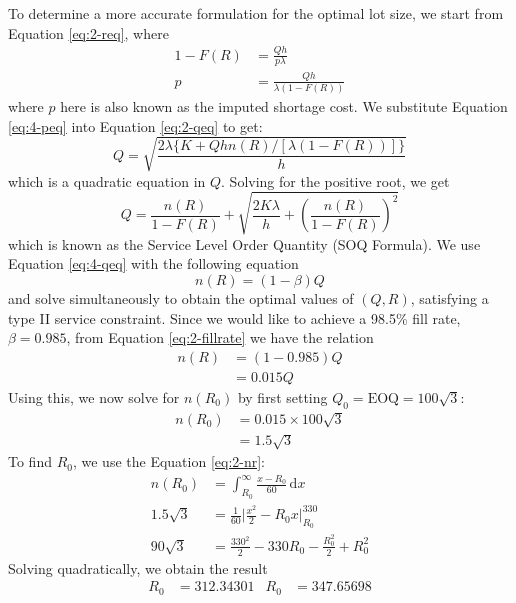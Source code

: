 \documentclass[12pt]{article}
\begin{document}
To determine a more accurate formulation for the optimal lot size, we start from Equation \ref{eq:2-req}, where \begin{align}\nonumber
    1- F(R) &= \frac{Qh}{p\lambda} \\ \label{eq:4-peq}
    p &= \frac{Qh}{\lambda(1-F(R))}
\end{align} where $p$ here is also known as the imputed shortage cost. We substitute Equation \ref{eq:4-peq} into Equation \ref{eq:2-qeq} to get: \begin{equation*}
    Q = \sqrt{ \frac{2\lambda \{K + Qhn(R) / [\lambda(1-F(R))]\}}{h}}
\end{equation*} which is a quadratic equation in $Q$. Solving for the positive root, we get \begin{equation}\label{eq:4-qeq}
    Q = \frac{n(R)}{1 - F(R)} + \sqrt{ \frac{2 K\lambda }{h} + \left( \frac{n(R)}{1-F(R)} \right)^{2}}
\end{equation} which is known as the Service Level Order Quantity (SOQ Formula). We use Equation \ref{eq:4-qeq} with the following equation \begin{equation}\label{eq:4-nreq}
    n(R) = (1-\beta)Q 
\end{equation} and solve simultaneously to obtain the optimal values of $(Q,R)$, satisfying a type II service constraint. Since we would like to achieve a 98.5\% fill rate, $\beta = 0.985$, from Equation \ref{eq:2-fillrate} we have the relation \begin{align*}
    n(R) &= (1-0.985)Q \\ 
    &= 0.015Q
\end{align*} Using this, we now solve for $n(R_{0})$ by first setting $Q_{0} = \text{EOQ} = 100\sqrt{3}$: \begin{align*}
    n(R_{0}) &= 0.015 \times 100\sqrt{3} \\ 
    &= 1.5\sqrt{3}
\end{align*} To find $R_{0}$, we use the Equation \ref{eq:2-nr}: \begin{align*}
    n(R_{0}) &= \int_{R_{0}}^{\infty} \frac{x-R_{0}}{60} \, \mathrm{d}x \\ 
    1.5\sqrt{3} &= \frac{1}{60} \Big| \frac{x^{2}}{2} - R_{0}x \Big|^{330}_{R_{0}} \\ 
    90\sqrt{3} &= \frac{330^{2}}{2} - 330 R_{0} - \frac{R_{0}^{2}}{2} + R_{0}^{2} 
\end{align*} Solving quadratically, we obtain the result \begin{align*}
    R_{0} &= \mathbf{312.34301} & R_{0} &= 347.65698 

\end{align*}
\end{document}
